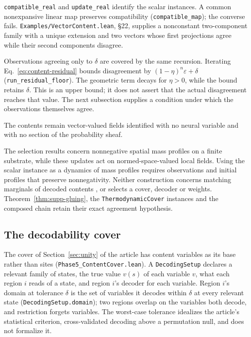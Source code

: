 \documentclass{article}
\renewcommand{\cite}[1]{\citep{#1}}
\begin{document}
\nolinkurl{compatible_real} and \nolinkurl{update_real}
identify the scalar instances. A common nonexpansive linear map preserves
compatibility (\nolinkurl{compatible_map}); the converse fails.
\nolinkurl{Examples/VectorContent.lean}, \S22, supplies a
nonconstant two-component family with a unique extension and two vectors
whose first projections agree while their second components disagree.

Observations agreeing only to $\delta$ are covered by the same recursion.
Iterating Eq.~\eqref{eq:content-residual} bounds disagreement by
$(1-\eta)^{n}\varepsilon+\delta$
(\nolinkurl{run_residual_floor}). The geometric term
decays for $\eta>0$, while the bound retains $\delta$. This is an upper bound;
it does not assert that the actual disagreement reaches that value. The next
subsection supplies a condition under which the observations themselves agree.

The contents remain vector-valued fields identified with no neural variable and
with no section of the probability sheaf.

The selection results concern nonnegative spatial mass profiles on a finite
substrate, while these updates act on normed-space-valued local fields. Using
the scalar instance as a dynamics of mass profiles requires observations and initial
profiles that preserve nonnegativity. Neither construction concerns matching
marginals of decoded contents \cite{abramsky2011}, or selects a cover, decoder
or weights. Theorem~\ref{thm:supp-gluing}, the \texttt{ThermodynamicCover} instances and the
composed chain retain their exact agreement hypothesis.

\subsection{The decodability cover}
\label{sec:supp-content-cover}

The cover of Section~\ref{sec:unity} of the article has content variables as its base rather than sites (\nolinkurl{Phase5_ContentCover.lean}). A \texttt{DecodingSetup} declares a relevant family of states, the true value $v(s)$ of each variable $v$, what each region $i$ reads of a state, and region $i$'s decoder for each variable. Region $i$'s domain at tolerance $\delta$ is the set of variables it decodes within $\delta$ at every relevant state (\texttt{DecodingSetup.domain}); two regions overlap on the variables both decode, and restriction forgets variables. The worst-case tolerance idealizes the article's statistical criterion, cross-validated decoding above a permutation null, and does not formalize it.
\end{document}
